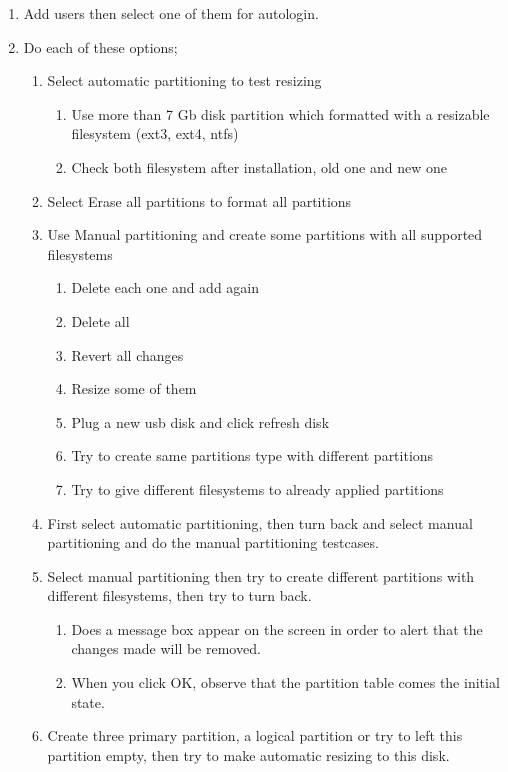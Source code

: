 \documentclass[a4paper,10pt]{article}
\begin{document}
\begin{enumerate}
\item Add users then select one of them for autologin.

\item Do each of these options;
    \begin{enumerate}
        \item Select automatic partitioning to test resizing
        \begin{enumerate}
            \item Use more than 7 Gb disk partition which formatted with a resizable filesystem (ext3, ext4, ntfs)
            \item Check both filesystem after installation, old one and new one
        \end{enumerate}
        \item Select Erase all partitions to format all partitions
        \item Use Manual partitioning and create some partitions with all supported filesystems
        \begin{enumerate}
            \item Delete each one and add again
            \item Delete all
            \item Revert all changes
            \item Resize some of them
            \item Plug a new usb disk and click refresh disk
            \item Try to create same partitions type with different partitions
            \item Try to give different filesystems to already applied partitions
        \end{enumerate}
        \item First select  automatic partitioning,  then turn back and select manual partitioning and do the manual partitioning testcases.
        \item Select manual partitioning then try to create different partitions with different filesystems, then try to turn back.
        \begin{enumerate}
            \item Does a message box appear on the screen in order to alert that the changes made will be removed.
            \item When you click OK, observe that the partition table comes the initial state.
        \end{enumerate}
        \item Create three primary partition, a logical partition or try to left this partition empty, then try to make automatic resizing to this disk.
    \end{enumerate}


\end{enumerate}
\end{document}
